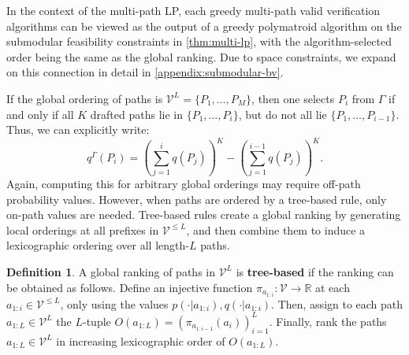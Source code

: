 \documentclass{article}
\theoremstyle{plain}
\theoremstyle{definition}
\newtheorem{definition}[theorem]{Definition}
\theoremstyle{remark}
\newcommand{\V}{\mathcal{V}}
\begin{document}
In the context of the multi-path LP, each greedy multi-path valid verification algorithms can be viewed as the output of a greedy polymatroid algorithm \citep{schrijver2003combinatorial} on the submodular feasibility constraints in \cref{thm:multi-lp}, with the algorithm-selected order being the same as the global ranking. Due to space constraints, we expand on this connection in detail in \cref{appendix:submodular-bv}. 

If the global ordering of paths is $\V^L = \{P_1,\ldots,P_M\}$, then one selects $P_i$ from $\Gamma$ if and only if all $K$ drafted paths lie in $\{P_1,\ldots,P_i\}$, but do not all lie $\{P_1,\ldots,P_{i-1}\}$. Thus, we can explicitly write:
\begin{equation}
    q^\Gamma(P_i) = \left(\sum_{j=1}^i q(P_j)\right)^K - \left(\sum_{j=1}^{i-1} q(P_j)\right)^K.
    \label{eqn:closed-qgamma}
\end{equation}
Again, computing this for arbitrary global orderings may require off-path probability values. However, when paths are ordered by a tree-based rule, only on-path values are needed. Tree-based rules create a global ranking by generating local orderings at all prefixes in $\V^{\leq L}$, and then combine them to induce a lexicographic ordering over all length-$L$ paths.

\begin{definition}
    A global ranking of paths in $\V^L$ is \textbf{tree-based} if the ranking can be obtained as follows. Define an injective function $\pi_{a_{1:i}}:\V \to \mathbb{R}$ at each $a_{1:i} \in \V^{\leq L}$, only using the values $p(\cdot|a_{1:i}),q(\cdot|a_{1:i})$. Then, assign to each path $a_{1:L} \in \V^L$ the $L$-tuple $O(a_{1:L})=(\pi_{a_{1:i-1}}(a_{i}))_{i=1}^{L}$. Finally, rank the paths $a_{1:L} \in \V^L$ in increasing lexicographic order of $O(a_{1:L})$.
\end{definition}
\end{document}

